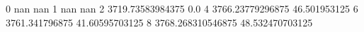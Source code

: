 0 nan nan
1 nan nan
2 3719.73583984375 0.0
4 3766.23779296875 46.501953125
6 3761.341796875 41.60595703125
8 3768.268310546875 48.532470703125
